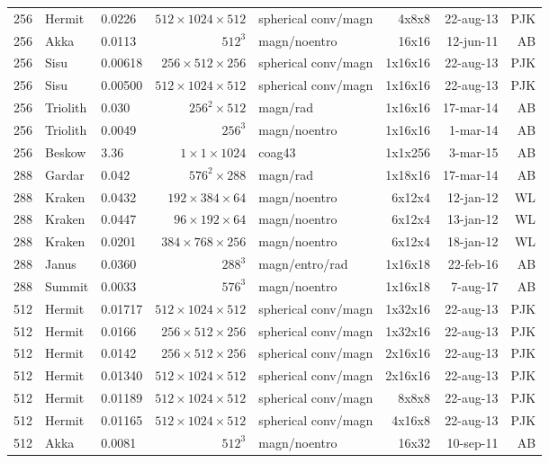 \documentclass[\mydriver,12pt,twoside,notitlepage,a4paper]{article}
\begin{document}
\begin{center}
\begin{footnotesize}
\begin{longtable}{rllrlrrr}
 256 &Hermit&0.0226&$512{\!\times\!}1024{\!\times\!}512$&spherical conv/magn&4x8x8&22-aug-13&PJK\\
 256 & Akka  &0.0113& $512^3$ & magn/noentro & 16x16  & 12-jun-11 & AB \\
 256 &Sisu&0.00618&$256{\!\times\!}512{\!\times\!}256$&spherical conv/magn&1x16x16&22-aug-13&PJK\\
 256 &Sisu&0.00500&$512{\!\times\!}1024{\!\times\!}512$&spherical conv/magn&1x16x16&22-aug-13&PJK\\
 256 &Triolith&0.030&$256^2\times512$ & magn/rad & 1x16x16& 17-mar-14 & AB \\
 256 &Triolith&0.0049&$256^3$ & magn/noentro & 1x16x16&  1-mar-14 & AB \\
 256&Beskow&3.36&$1{\!\times\!}1{\!\times\!}1024$&coag43&1x1x256&3-mar-15& AB \\
 288 &Gardar&0.042&$576^2{\!\times\!}288$ & magn/rad & 1x18x16 & 17-mar-14&AB\\
 288 &Kraken&0.0432&$192{\!\times\!}384{\!\times\!}64$&magn/noentro&6x12x4&12-jan-12&WL\\
 288 & Kraken& 0.0447  &$96{\!\times\!}192{\!\times\!}64$ & magn/noentro & 6x12x4 &13-jan-12 & WL\\
 288 & Kraken& 0.0201  &$384{\!\times\!}768{\!\times\!}256$ & magn/noentro & 6x12x4 &18-jan-12 & WL\\
 288 & Janus &0.0360& $288^3$ &magn/entro/rad& 1x16x18 &22-feb-16 & AB \\
 288 &Summit &0.0033& $576^3$ & magn/noentro & 1x16x18&  7-aug-17 & AB \\ %
 512 &Hermit&0.01717&$512{\!\times\!}1024{\!\times\!}512$&spherical conv/magn&1x32x16&22-aug-13&PJK\\
 512 &Hermit&0.0166&$256{\!\times\!}512{\!\times\!}256$&spherical conv/magn&1x32x16&22-aug-13&PJK\\
 512 &Hermit&0.0142&$256{\!\times\!}512{\!\times\!}256$&spherical conv/magn&2x16x16&22-aug-13&PJK\\
 512 &Hermit&0.01340&$512{\!\times\!}1024{\!\times\!}512$&spherical conv/magn&2x16x16&22-aug-13&PJK\\
 512 &Hermit&0.01189&$512{\!\times\!}1024{\!\times\!}512$&spherical conv/magn&8x8x8&22-aug-13&PJK\\
 512 &Hermit&0.01165&$512{\!\times\!}1024{\!\times\!}512$&spherical conv/magn&4x16x8&22-aug-13&PJK\\
 512 & Akka  &0.0081& $512^3$ & magn/noentro & 16x32  & 10-sep-11 & AB \\

\end{longtable}
\end{footnotesize}
\end{center}
\end{document}
